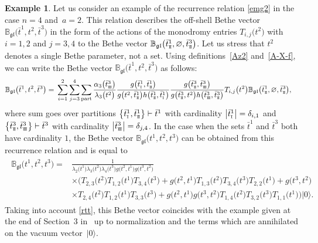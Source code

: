 \documentclass[10pt,a4paper]{amsart}
\newcommand{\so}{\scriptscriptstyle \rm I}
\newcommand{\st}{\scriptscriptstyle \rm I\hspace{-1pt}I}
\newcommand{\sth}{\scriptscriptstyle \rm I\hspace{-1pt}I\hspace{-1pt}I}
\newcommand{\bt}{{\bar t}}
\theoremstyle{definition}
\newtheorem{exam}[thm]{Example}
\def\r#1{\eqref{#1}}
\def\rvec{|0\rangle}
\def\BBg{\mathbb{B}_{\mathfrak{gl}}}
\begin{document}
\begin{exam}\label{Exam31}
Let us consider an example of the recurrence relation \r{emg2} in the
case ${n=4}$ and~${a=2}$. This relation describes the off-shell Bethe vector
$\BBg\bigl(\bt^1,t^2,\bt^3\bigr)$ in the form of the actions of the monodromy
entries $T_{i,j}\bigl(t^2\bigr)$ with $i=1,2$ and $j=3,4$ to the Bethe vector $\BBg\bigl(\bt^1_{\st},\varnothing,\bt^3_{\st}\bigr)$. Let us stress that $t^2$ denotes a single Bethe parameter, not a set.
Using definitions~\r{Az2}
and~\r{A-X-f}, we can write the Bethe vector $\BBg\bigl(\bt^1,t^2,\bt^3\bigr)$
as follows:
\begin{align*}
\BBg\bigl(\bt^1,t^2,\bt^3\bigr)={}&\sum_{i=1}^2\sum_{j=3}^4\sum_{\rm part}
\frac{\alpha_3\bigl(\bt^3_{\sth}\bigr)}{\lambda_3\bigl(t^2\bigr)}
\frac{g\bigl(\bt^1_{\so},\bt^1_{\st}\bigr)}{g\bigl(t^2,\bt^1_{\st}\bigr) h\bigl(\bt^1_{\st},\bt^1_{\so}\bigr)}
\frac{g\bigl(\bt^3_{\st},\bt^3_{\sth}\bigr)}{g\bigl(\bt^3_{\st},t^2\bigr) h\bigl(\bt^3_{\sth},\bt^3_{\st}\bigr)}
 T_{i,j}\bigl(t^2\bigr)\BBg\bigl(\bt^1_{\st},\varnothing,\bt^3_{\st}\bigr) ,
\end{align*}
where sum goes over partitions $\bigl\{\bt^1_{\so},\bt^1_{\st}\bigr\}\vdash\bt^1$
with cardinality $\big|\bt^1_{\so}\big|=\delta_{i,1}$ and
$\bigl\{\bt^3_{\st},\bt^3_{\sth}\bigr\}\vdash\bt^3$
with cardinality $\big|\bt^3_{\sth}\big|=\delta_{j,4}$. In the case when the sets
$\bt^1$ and $\bt^3$ both have cardinality $1$, the Bethe vector
$\BBg\bigl(t^1,t^2,t^3\bigr)$ can be obtained from this recurrence relation and is equal to
\begin{align*}
\begin{split}
\BBg\bigl(t^1,t^2,t^3\bigr)={}&\frac{1}{\lambda_2\bigl(t^1\bigr) \lambda_3\bigl(t^2\bigr) \lambda_4\bigl(t^3\bigr)
g\bigl(t^2,t^1\bigr) g\bigl(t^3,t^2\bigr)}\\
&\times\bigl(T_{2,3}\bigl(t^2\bigr) T_{1,2}\bigl(t^1\bigr) T_{3,4}\bigl(t^3\bigr)+
g\bigl(t^2,t^1\bigr) T_{1,3}\bigl(t^2\bigr) T_{3,4}\bigl(t^3\bigr) T_{2,2}\bigl(t^1\bigr)+
g\bigl(t^3,t^2\bigr)\\
&\times T_{2,4}\bigl(t^2\bigr) T_{1,2}\bigl(t^1\bigr) T_{3,3}\bigl(t^3\bigr)+
g\bigl(t^2,t^1\bigr) g\bigl(t^3,t^2\bigr) T_{1,4}\bigl(t^2\bigr) T_{3,2}\bigl(t^3\bigr) T_{1,1}\bigl(t^1\bigr)\bigr)\rvec .
\end{split}
\end{align*}
Taking into account \r{rtt}, this Bethe vector coincides with the example given at the end of Section~3 in~\cite{KT1} up to normalization and the terms which are annihilated on the vacuum vector~$\rvec$.
\end{exam}
\end{document}
